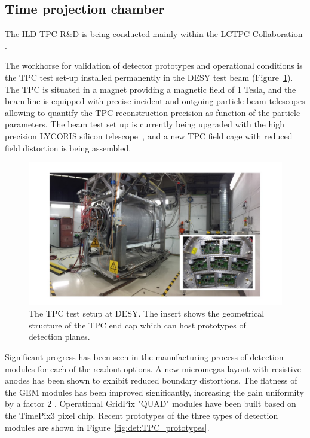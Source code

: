 \subsection{Time projection chamber}

The ILD TPC R\&D is being conducted mainly within the LCTPC Collaboration \cite{ild:bib:TPC_lctpc}. 

The workhorse for validation of detector prototypes and operational conditions is the TPC test set-up installed permanently in the DESY test beam\cite{ild:bib:TPC_desytb} (Figure~\ref{fig:det:TPC_test_setup}). The TPC is situated in a magnet providing a magnetic field of 1 Tesla, and the beam line is equipped with precise incident and outgoing particle beam telescopes allowing to quantify the TPC reconstruction precision as function of the particle parameters. The beam test set up is currently being upgraded with the high precision LYCORIS silicon telescope~\cite{ild:bib:TPC_lycoris}, and a new TPC field cage with reduced field distortion is being assembled.

\begin{figure}[t!]
\centering
\includegraphics[width=1.0\hsize]{Detector/fig/TPC_test_setup.jpg}
\caption{The TPC test setup at DESY. The insert shows the geometrical structure of the TPC end cap which can host prototypes of detection planes.}
\label{fig:det:TPC_test_setup}
\end{figure}

Significant progress has been seen in the manufacturing process of detection modules for each of the readout options. A new micromegas layout with resistive anodes has been shown to exhibit reduced boundary distortions\cite{ild:bib:TPC_distortions}. The flatness of the GEM modules has been improved significantly, increasing the gain uniformity by a factor 2 \cite{ild:bib:TPC_GEMflatness}. Operational GridPix "QUAD" modules have been built based on the TimePix3 pixel chip\cite{ild:bib:TPC_quad}. Recent prototypes of the three types of detection modules are shown in Figure~\ref{fig:det:TPC_prototypes}.  

